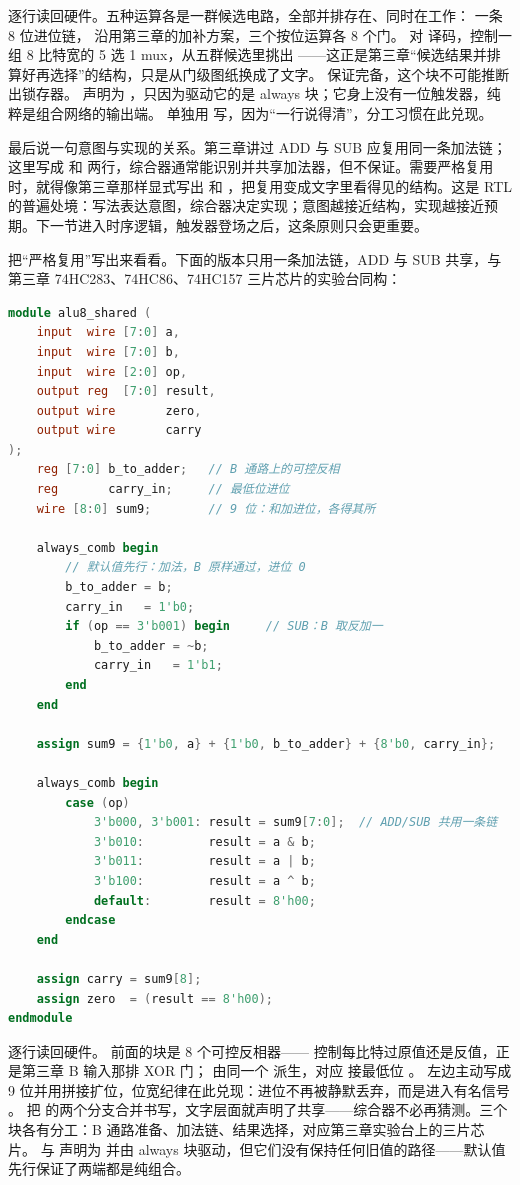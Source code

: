逐行读回硬件。五种运算各是一群候选电路，全部并排存在、同时在工作： 一条 8 位进位链， 沿用第三章的加补方案，三个按位运算各 8 个门。 对  译码，控制一组 8 比特宽的 5 选 1 mux，从五群候选里挑出 ——这正是第三章“候选结果并排算好再选择”的结构，只是从门级图纸换成了文字。 保证完备，这个块不可能推断出锁存器。 声明为 ，只因为驱动它的是 always 块；它身上没有一位触发器，纯粹是组合网络的输出端。 单独用  写，因为“一行说得清”，分工习惯在此兑现。

最后说一句意图与实现的关系。第三章讲过 ADD 与 SUB 应复用同一条加法链；这里写成  和  两行，综合器通常能识别并共享加法器，但不保证。需要严格复用时，就得像第三章那样显式写出  和 ，把复用变成文字里看得见的结构。这是 RTL 的普遍处境：写法表达意图，综合器决定实现；意图越接近结构，实现越接近预期。下一节进入时序逻辑，触发器登场之后，这条原则只会更重要。

把“严格复用”写出来看看。下面的版本只用一条加法链，ADD 与 SUB 共享，与第三章 74HC283、74HC86、74HC157 三片芯片的实验台同构：

\begin{lstlisting}[language=Verilog]
module alu8_shared (
    input  wire [7:0] a,
    input  wire [7:0] b,
    input  wire [2:0] op,
    output reg  [7:0] result,
    output wire       zero,
    output wire       carry
);
    reg [7:0] b_to_adder;   // B 通路上的可控反相
    reg       carry_in;     // 最低位进位
    wire [8:0] sum9;        // 9 位：和加进位，各得其所

    always_comb begin
        // 默认值先行：加法，B 原样通过，进位 0
        b_to_adder = b;
        carry_in   = 1'b0;
        if (op == 3'b001) begin     // SUB：B 取反加一
            b_to_adder = ~b;
            carry_in   = 1'b1;
        end
    end

    assign sum9 = {1'b0, a} + {1'b0, b_to_adder} + {8'b0, carry_in};

    always_comb begin
        case (op)
            3'b000, 3'b001: result = sum9[7:0];  // ADD/SUB 共用一条链
            3'b010:         result = a & b;
            3'b011:         result = a | b;
            3'b100:         result = a ^ b;
            default:        result = 8'h00;
        endcase
    end

    assign carry = sum9[8];
    assign zero  = (result == 8'h00);
endmodule
\end{lstlisting}

逐行读回硬件。 前面的块是 8 个可控反相器—— 控制每比特过原值还是反值，正是第三章 B 输入那排 XOR 门； 由同一个  派生，对应  接最低位 。 左边主动写成 9 位并用拼接扩位，位宽纪律在此兑现：进位不再被静默丢弃，而是进入有名信号 。 把  的两个分支合并书写，文字层面就声明了共享——综合器不必再猜测。三个块各有分工：B 通路准备、加法链、结果选择，对应第三章实验台上的三片芯片。 与  声明为  并由 always 块驱动，但它们没有保持任何旧值的路径——默认值先行保证了两端都是纯组合。

